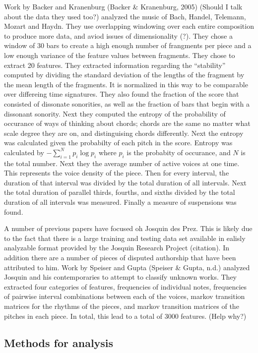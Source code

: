 \documentclass[12pt,twoside]{reedthesis}
\theoremstyle{definition}
\theoremstyle{definition}
\theoremstyle{definition}
\theoremstyle{remark}
\begin{document}
Work by Backer and Kranenburg (Backer \& Kranenburg, 2005) (Should I
talk about the data they used too?) analyzed the music of Bach, Handel,
Telemann, Mozart and Haydn. They use overlapping windowing over each
entire composition to produce more data, and aviod issues of
dimensionality (?). They chose a window of 30 bars to create a high
enough number of frangments per piece and a low enough variance of the
feature values between fragments. They chose to extract 20 features.
They extracted information regarding the ``stability'' computed by
dividing the standard deviation of the lengths of the fragment by the
mean length of the fragments. It is normalized in this way to be
comparable over differeing time signatures. They also found the fraction
of the score that consisted of dissonate sonorities, as well as the
fraction of bars that begin with a dissonant sonority. Next they
computed the entropy of the probability of occurance of ways of thinking
about chords; chords are the same no matter what scale degree they are
on, and distinguising chords differently. Next the entropy was
calculated given the probabilty of each pitch in the score. Entropy was
calculated by \(-\sum_{i = 1}^{N}p_i\log{p_i}\) where \(p_i\) is the
probabity of occurance, and \(N\) is the total number. Next they the
average number of active voices at one time. This represents the voice
density of the piece. Then for every interval, the duration of that
interval was divided by the total duration of all intervals. Next the
total duration of parallel thirds, fourths, and sixths divided by the
total duration of all intervals was measured. Finally a measure of
suspensions was found.

A number of previous papers have focused oh Josquin des Prez. This is
likely due to the fact that there is a large training and testing data
set available in ealisly analyzable format provided by the Josquin
Research Project (citation). In addition there are a number of pieces of
disputed authorship that have been attributed to him. Work by Speiser
and Gupta (Speiser \& Gupta, n.d.) analyzed Josquin and his
contemporaries to attempt to classify unknown works. They extracted four
categories of features, frequencies of individual notes, frequencies of
pairwise interval combinations between each of the voices, markov
transition matrices for the rhythms of the pieces, and markov transition
matrices of the pitches in each piece. In total, this lead to a total of
3000 features. (Help why?)

\subsection{Methods for analysis}\label{methods-for-analysis}
\end{document}
